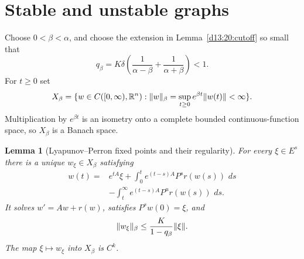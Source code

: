 \documentclass[11pt,oneside]{book}
\newtheorem{lemma}[theorem]{Lemma}
\theoremstyle{definition}
\theoremstyle{remark}\newtheorem{remark}[theorem]{Remark}
\newcommand{\R}{\mathbb R}\newcommand{\C}{\mathbb C}
\newcommand{\dd}{\,d}\newcommand{\id}{\operatorname{id}}
\begin{document}
\section{Stable and unstable graphs}
Choose $0<\beta<\alpha$, and choose the extension in
Lemma~\ref{d13:20:cutoff} so small that
\[
 q_\beta=K\delta\left(\frac1{\alpha-\beta}
                         +\frac1{\alpha+\beta}\right)<1.
\]
For $t\geq0$ set
\[
 X_\beta=\{w\in C([0,\infty),\R^n):
                 \norm{w}_\beta=\sup_{t\geq0}e^{\beta t}\norm{w(t)}<\infty\}.
\]
Multiplication by $e^{\beta t}$ is an isometry onto a complete bounded
continuous-function space, so $X_\beta$ is a Banach space.

\begin{lemma}[Lyapunov--Perron fixed points and their regularity]
\label{d13:20:perron}
For every $\xi\in E^s$ there is a unique $w_\xi\in X_\beta$ satisfying
\begin{align*}
 w(t)={}&e^{tA}\xi+
       \int_0^t e^{(t-s)A}P^s r(w(s))\,\dd s\\
       &-\int_t^\infty e^{(t-s)A}P^u r(w(s))\,\dd s.
\end{align*}
It solves $w'=Aw+r(w)$, satisfies $P^s w(0)=\xi$, and
\[
 \lVert w_\xi\rVert_\beta\leq\frac{K}{1-q_\beta}\lVert\xi\rVert.
\]
The map $\xi\mapsto w_\xi$ into $X_\beta$ is $C^k$.
\end{lemma}
\end{document}
